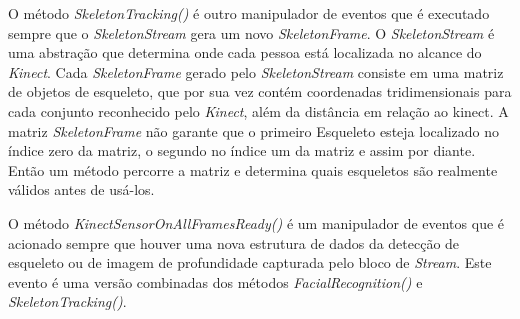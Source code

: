 O método \textit{SkeletonTracking()} é outro manipulador de eventos que é executado sempre que o \textit{SkeletonStream} gera um novo \textit{SkeletonFrame}. O \textit{SkeletonStream} é uma abstração que determina onde cada pessoa está localizada no alcance do \textit{Kinect}. Cada \textit{SkeletonFrame} gerado pelo \textit{SkeletonStream} consiste em uma matriz de objetos de esqueleto, que por sua vez contém coordenadas tridimensionais para cada conjunto reconhecido pelo \textit{Kinect}, além da distância em relação ao kinect. A matriz \textit{SkeletonFrame} não garante que o primeiro Esqueleto esteja localizado no índice zero da matriz, o segundo no índice um da matriz e assim por diante. Então um método percorre a matriz e determina quais esqueletos são realmente válidos antes de usá-los.

O método \textit{KinectSensorOnAllFramesReady()} é um manipulador de eventos que é acionado sempre que houver uma nova estrutura de dados da detecção de esqueleto ou de imagem de profundidade capturada pelo bloco de \textit{Stream}. Este evento é uma versão combinadas dos métodos \textit{FacialRecognition()} e \textit{SkeletonTracking()}.